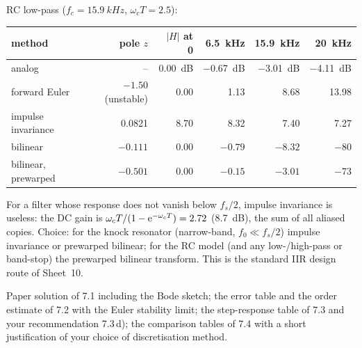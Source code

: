 \begin{solution}
RC low-pass ($f_c=\SI{15.9}{kHz}$, $\omega_cT=2.5$):
\begin{center}\small
\begin{tabular}{lrrrrr}
\toprule
method & pole $z$ & $|H|$ at 0 & \SI{6.5}{kHz} & \SI{15.9}{kHz} & \SI{20}{kHz}\\
\midrule
analog & -- & \SI{0.00}{dB} & \SI{-0.67}{dB} & \SI{-3.01}{dB} & \SI{-4.11}{dB}\\
forward Euler & $-1.50$ (unstable) & 0.00 & 1.13 & 8.68 & 13.98\\
impulse invariance & 0.0821 & 8.70 & 8.32 & 7.40 & 7.27\\
bilinear & $-0.111$ & 0.00 & $-0.79$ & $-8.32$ & $-80$\\
bilinear, prewarped & $-0.501$ & 0.00 & $-0.15$ & $-3.01$ & $-73$\\
\bottomrule
\end{tabular}
\end{center}
For a filter whose response does not vanish below $f_s/2$, impulse invariance
is useless: the DC gain is $\omega_cT/(1-\mathrm{e}^{-\omega_cT})=2.72$ (\SI{+8.7}{dB}),
the sum of all aliased copies. Choice: for the knock resonator (narrow-band,
$f_0\ll f_s/2$) impulse invariance or prewarped bilinear; for the RC model
(and any low-/high-pass or band-stop) the prewarped bilinear transform. This
is the standard IIR design route of Sheet~10.
\end{solution}

\begin{deliverables}
Paper solution of 7.1 including the Bode sketch; the error table and the
order estimate of 7.2 with the Euler stability limit; the step-response table
of 7.3 and your recommendation 7.3\,d); the comparison tables of 7.4 with a
short justification of your choice of discretisation method.
\end{deliverables}
